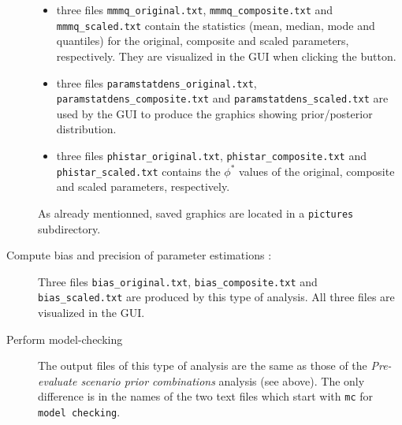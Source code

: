 \begin{description}
  \begin{itemize}
   \item three files \texttt{mmmq\_original.txt}, \texttt{mmmq\_composite.txt} and \texttt{mmmq\_scaled.txt} contain the statistics (mean, median, mode and quantiles) for the original, composite and scaled parameters, respectively. They are visualized in the GUI when clicking the  button. 
   \item three files \texttt{paramstatdens\_original.txt}, \texttt{paramstatdens\_composite.txt} and \texttt{paramstatdens\_scaled.txt} are used by the GUI to produce the graphics showing prior/posterior distribution.
   \item three files \texttt{phistar\_original.txt}, \texttt{phistar\_composite.txt} and \texttt{phistar\_scaled.txt} contains the $\phi^*$ values of the original, composite and scaled parameters, respectively.
  \end{itemize}
As already mentionned, saved graphics are located in a \texttt{pictures} subdirectory.
 \item [Compute bias and precision of parameter estimations :] Three files \texttt{bias\_original.txt}, \texttt{bias\_composite.txt} and \texttt{bias\_scaled.txt} are produced by this type of analysis. All three files are visualized in the GUI. 
 \item [Perform model-checking] The output files of this type of analysis are the same as those of the \textit{Pre-evaluate scenario prior combinations} analysis (see above). The only difference is in the names of the two text files which start with \texttt{mc} for \texttt{model checking}. 
\end{description}
~\\

